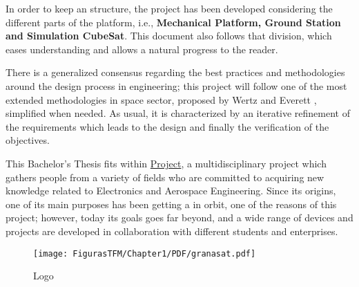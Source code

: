In order to keep an structure, the project has been developed considering the different parts of the platform, i.e., \textbf{Mechanical Platform, Ground Station and Simulation CubeSat}. This document also follows that division, which eases understanding and allows a natural progress to the reader.


There is a generalized consensus regarding the best practices and methodologies around the design process in engineering; this project will follow one of the most extended methodologies in space sector, proposed by Wertz and Everett \cite{smad}, simplified when needed. As usual, it is characterized by an iterative refinement of the requirements which leads to the design and finally the verification of the objectives.


%
%



This Bachelor's Thesis fits within \href{http://granasat.ugr.es/}{ Project}, a multidisciplinary project which gathers people from a variety of fields who are committed to acquiring new knowledge related to Electronics and Aerospace Engineering. Since its origins, one of its main purposes has been getting a  in orbit, one of the reasons of this project; however, today its goals goes far beyond, and a wide range of devices and projects are developed in collaboration with different students and enterprises.

			\begin{figure}[H]
			\centering
			\texttt{[image: FigurasTFM/Chapter1/PDF/granasat.pdf]}
			\caption{ Logo}
			\end{figure}


